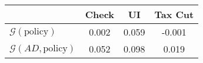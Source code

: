 \begin{tabular}{@{}lccc@{}} 
\toprule 
                          & Check      & UI    & Tax Cut    \\  \midrule 
$\mathcal{G}(\text{policy})$ & 0.002  & 0.059  & -0.001     \\ 
$\mathcal{G}(AD,\text{policy})$ & 0.052  & 0.098  & 0.019     \\ 
\end{tabular}  
